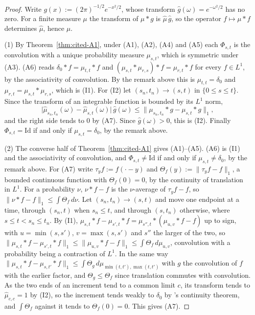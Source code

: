 \begin{proof}
Write $g(x) := (2\pi)^{-1/2}e^{-x^2/2}$, whose transform $\widehat g(\omega) = e^{-\omega^2/2}$
has no zero. For a finite measure $\mu$ the transform of $\mu * g$ is $\widehat\mu\,\widehat g$,
so the operator $f \mapsto \mu * f$ determines $\widehat\mu$, hence $\mu$.

(1) By Theorem~\ref{thm:cited-A1}, under (A1), (A2), (A4) and (A5) each
$\Phi_{s,t}$ is the convolution with a unique probability measure $\mu_{s,t}$, which is
symmetric under (A3). (A6) reads $\delta_0 * f = \mu_{t,t} * f$ and
$(\mu_{s,t} * \mu_{r,s}) * f = \mu_{r,t} * f$ for every $f \in L^1$, by the associativity of
convolution. By the remark above this is $\mu_{t,t} = \delta_0$ and
$\mu_{r,t} = \mu_{s,t} * \mu_{r,s}$, which is (I1). For (I2) let $(s_n,t_n) \to (s,t)$ in
$\{0 \le s \le t\}$. Since the transform of an integrable function is bounded by its $L^1$ norm,
\[
  \bigl|\widehat\mu_{s_n,t_n}(\omega) - \widehat\mu_{s,t}(\omega)\bigr|\,\widehat g(\omega)
  \le \bigl\|\mu_{s_n,t_n} * g - \mu_{s,t} * g\bigr\|_1 ,
\]
and the right side tends to $0$ by (A7). Since $\widehat g(\omega) > 0$, this is (I2). Finally
$\Phi_{s,t} = \mathrm{Id}$ if and only if $\mu_{s,t} = \delta_0$, by the remark above.

(2) The converse half of Theorem~\ref{thm:cited-A1} gives (A1)--(A5). (A6) is (I1) and the
associativity of convolution, and $\Phi_{s,t} \ne \mathrm{Id}$ if and only if
$\mu_{s,t} \ne \delta_0$, by the remark above. For (A7) write $\tau_yf := f(\cdot - y)$ and
$\Theta_f(y) := \|\tau_yf - f\|_1$, a bounded continuous function with $\Theta_f(0) = 0$, by the
continuity of translation in $L^1$. For a probability $\nu$, $\nu * f - f$ is the
$\nu$-average of $\tau_yf - f$, so $\|\nu * f - f\|_1 \le \int\Theta_f\,d\nu$. Let
$(s_n,t_n) \to (s,t)$ and move one endpoint at a time,
through $(s_n, t)$ when $s_n \le t$, and through $(s, t_n)$ otherwise, where
$s \le t < s_n \le t_n$. By (I1),
$\mu_{s,t} * f - \mu_{s',t} * f = \mu_{s'',t} * (\mu_{u,v} * f - f)$ up to sign, with
$u = \min(s, s')$, $v = \max(s, s')$ and $s''$ the larger of the two, so
$\|\mu_{s,t} * f - \mu_{s',t} * f\|_1 \le \|\mu_{u,v} * f - f\|_1 \le \int\Theta_f\,d\mu_{u,v}$,
convolution with a probability being a contraction of $L^1$. In the same way
$\|\mu_{s,t} * f - \mu_{s,t'} * f\|_1 \le \int\Theta_g\,d\mu_{\min(t,t'),\max(t,t')}$ with $g$ the
convolution of $f$ with the earlier factor, and $\Theta_g \le \Theta_f$ since translation commutes
with convolution. As the two ends of an increment tend to a common limit $c$, its transform tends
to $\widehat\mu_{c,c} = 1$ by (I2), so the increment tends weakly to $\delta_0$ by \Levy's
continuity theorem, and $\int\Theta_f$ against it tends to $\Theta_f(0) = 0$. This gives (A7).


\end{proof}
